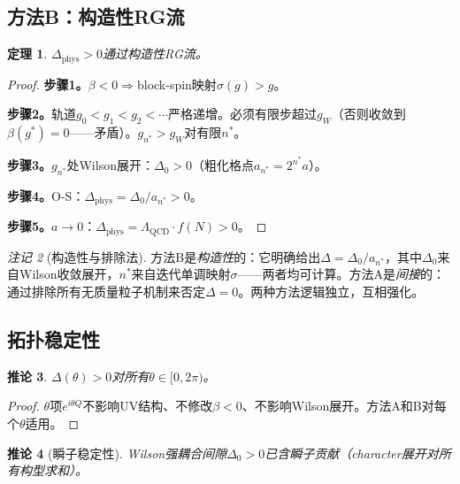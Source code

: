 \documentclass[12pt,a4paper]{article}
\theoremstyle{plain}
\newtheorem{theorem}{定理}[section]
\newtheorem{corollary}[theorem]{推论}
\theoremstyle{definition}
\theoremstyle{remark}
\newtheorem{remark}[theorem]{注记}
\begin{document}
\subsection{方法B：构造性RG流}\label{sec:methodB}

\begin{theorem}\label{thm:physB}
$\Delta_{\mathrm{phys}}>0$通过构造性RG流。
\end{theorem}

\begin{proof}
\textbf{步骤1。}$\beta<0\Rightarrow$block-spin映射$\sigma(g)>g$。

\textbf{步骤2。}轨道$g_0<g_1<g_2<\cdots$严格递增。必须有限步超过$g_W$（否则收敛到$\beta(g^*)=0$——矛盾）。$g_{n^*}>g_W$对有限$n^*$。

\textbf{步骤3。}$g_{n^*}$处Wilson展开：$\Delta_0>0$（粗化格点$a_{n^*}=2^{n^*}a$）。

\textbf{步骤4。}O-S\cite{OsterwalderSeiler1978}：$\Delta_{\mathrm{phys}}=\Delta_0/a_{n^*}>0$。

\textbf{步骤5。}$a\to 0$：$\Delta_{\mathrm{phys}}=\Lambda_{\mathrm{QCD}}\cdot f(N)>0$。
\end{proof}

\begin{remark}[构造性与排除法]
方法B是\emph{构造性}的：它明确给出$\Delta=\Delta_0/a_{n^*}$，其中$\Delta_0$来自Wilson收敛展开，$n^*$来自迭代单调映射$\sigma$——两者均可计算。方法A是\emph{间接}的：通过排除所有无质量粒子机制来否定$\Delta=0$。两种方法逻辑独立，互相强化。
\end{remark}

\subsection{拓扑稳定性}\label{sec:theta}

\begin{corollary}\label{cor:theta}
$\Delta(\theta)>0$对所有$\theta\in[0,2\pi)$。
\end{corollary}

\begin{proof}
$\theta$项$e^{i\theta Q}$不影响UV结构、不修改$\beta<0$、不影响Wilson展开。方法A和B对每个$\theta$适用。
\end{proof}

\begin{corollary}[瞬子稳定性]\label{cor:inst}
Wilson强耦合间隙$\Delta_0>0$已含瞬子贡献（character展开对所有构型求和）。
\end{corollary}
\end{document}
